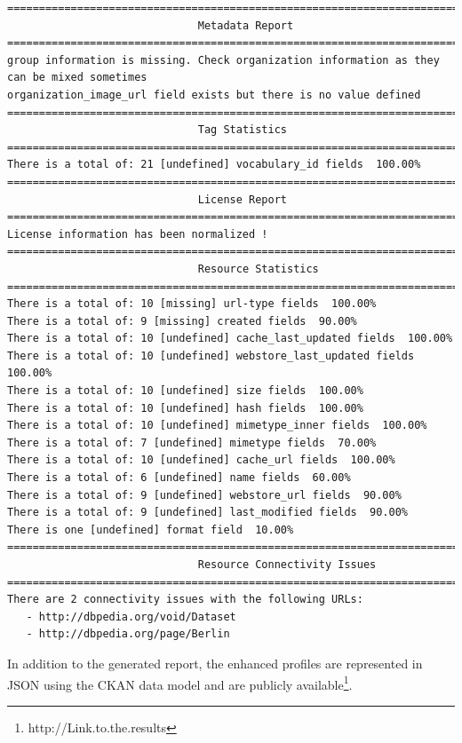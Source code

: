 \documentclass[runningheads,a4paper]{llncs}
\begin{document}
\begin{lstlisting}
=======================================================================
                              Metadata Report
=======================================================================
group information is missing. Check organization information as they can be mixed sometimes
organization_image_url field exists but there is no value defined
=======================================================================
                              Tag Statistics
=======================================================================
There is a total of: 21 [undefined] vocabulary_id fields  100.00%
=======================================================================
                              License Report
=======================================================================
License information has been normalized !
=======================================================================
                              Resource Statistics
=======================================================================
There is a total of: 10 [missing] url-type fields  100.00%
There is a total of: 9 [missing] created fields  90.00%
There is a total of: 10 [undefined] cache_last_updated fields  100.00%
There is a total of: 10 [undefined] webstore_last_updated fields  100.00%
There is a total of: 10 [undefined] size fields  100.00%
There is a total of: 10 [undefined] hash fields  100.00%
There is a total of: 10 [undefined] mimetype_inner fields  100.00%
There is a total of: 7 [undefined] mimetype fields  70.00%
There is a total of: 10 [undefined] cache_url fields  100.00%
There is a total of: 6 [undefined] name fields  60.00%
There is a total of: 9 [undefined] webstore_url fields  90.00%
There is a total of: 9 [undefined] last_modified fields  90.00%
There is one [undefined] format field  10.00%
=======================================================================
                              Resource Connectivity Issues
=======================================================================
There are 2 connectivity issues with the following URLs:
   - http://dbpedia.org/void/Dataset
   - http://dbpedia.org/page/Berlin
\end{lstlisting}

In addition to the generated report, the enhanced profiles are represented in JSON using the CKAN data model and are publicly available\footnote{http://Link.to.the.results}.\\
\end{document}
